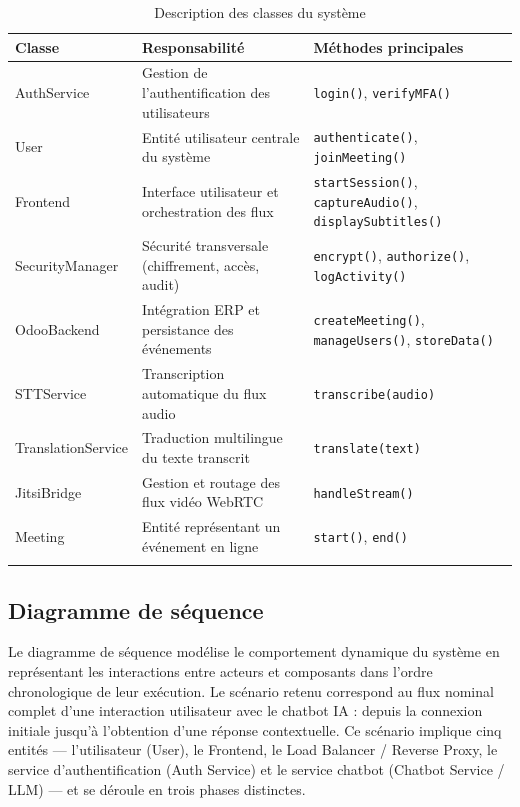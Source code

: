 \begin{longtable}{|m{3.5cm}|m{5.5cm}|m{4cm}|}
\hline
\textbf{Classe} & \textbf{Responsabilité} & \textbf{Méthodes principales} \\
\hline
\endhead
\endfoot
\endlastfoot
\hline
AuthService & Gestion de l'authentification des utilisateurs & \texttt{login()}, \texttt{verifyMFA()} \\
\hline
User & Entité utilisateur centrale du système & \texttt{authenticate()}, \texttt{joinMeeting()} \\
\hline
Frontend & Interface utilisateur et orchestration des flux & \texttt{startSession()}, \texttt{captureAudio()}, \texttt{displaySubtitles()} \\
\hline
SecurityManager & Sécurité transversale (chiffrement, accès, audit) & \texttt{encrypt()}, \texttt{authorize()}, \texttt{logActivity()} \\
\hline
OdooBackend & Intégration ERP et persistance des événements & \texttt{createMeeting()}, \texttt{manageUsers()}, \texttt{storeData()} \\
\hline
STTService & Transcription automatique du flux audio & \texttt{transcribe(audio)} \\
\hline
TranslationService & Traduction multilingue du texte transcrit & \texttt{translate(text)} \\
\hline
JitsiBridge & Gestion et routage des flux vidéo WebRTC & \texttt{handleStream()} \\
\hline
Meeting & Entité représentant un événement en ligne & \texttt{start()}, \texttt{end()} \\
\hline
\captionsetup{justification=centering,margin=2cm}
\caption{Description des classes du système}
\label{tab:classes}
\end{longtable}

\subsection{Diagramme de séquence}
Le diagramme de séquence modélise le comportement dynamique du système en représentant les interactions entre acteurs et composants dans l'ordre chronologique de leur exécution. Le scénario retenu correspond au flux nominal complet d'une interaction utilisateur avec le chatbot IA : depuis la connexion initiale jusqu'à l'obtention d'une réponse contextuelle. Ce scénario implique cinq entités — l'utilisateur (User), le Frontend, le Load Balancer / Reverse Proxy, le service d'authentification (Auth Service) et le service chatbot (Chatbot Service / LLM) — et se déroule en trois phases distinctes.


